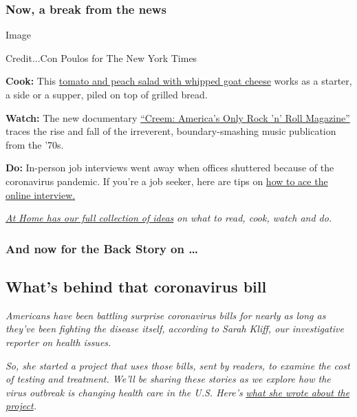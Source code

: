 \hypertarget{now-a-break-from-the-news}{%
\subsubsection{Now, a break from the
news}\label{now-a-break-from-the-news}}

Image

Credit...Con Poulos for The New York Times

\textbf{Cook:} This
\href{https://cooking.nytimes3xbfgragh.onion/recipes/1020367-tomato-and-peach-salad-with-whipped-goat-cheese}{tomato
and peach salad with whipped goat cheese} works as a starter, a side or
a supper, piled on top of grilled bread.

\textbf{Watch:} The new documentary
\href{https://www.nytimes3xbfgragh.onion/2020/08/03/arts/music/creem-magazine-documentary.html?action=click\&module=RelatedLinks\&pgtype=collection}{``Creem:
America's Only Rock 'n' Roll Magazine''} traces the rise and fall of the
irreverent, boundary-smashing music publication from the '70s.

\textbf{Do:} In-person job interviews went away when offices shuttered
because of the coronavirus pandemic. If you're a job seeker, here are
tips on
\href{https://www.nytimes3xbfgragh.onion/2020/08/03/business/online-job-interview-tips.html}{how
to ace the online interview.}

\href{https://www.nytimes3xbfgragh.onion/spotlight/at-home}{\emph{At
Home has our full collection of ideas}} \emph{on what to read, cook,
watch and do.}

\hypertarget{and-now-for-the-back-story-on-}{%
\subsubsection{And now for the Back Story on
\ldots{}}\label{and-now-for-the-back-story-on-}}

\hypertarget{whats-behind-that-coronavirus-bill}{%
\subsection{What's behind that coronavirus
bill}\label{whats-behind-that-coronavirus-bill}}

\emph{Americans have been battling surprise coronavirus bills for nearly
as long as they've been fighting the disease itself, according to Sarah
Kliff, our investigative reporter on health issues.}

\emph{So, she started a project that uses those bills, sent by readers,
to examine the cost of testing and treatment. We'll be sharing these
stories as we explore how the virus outbreak is changing health care in
the U.S. Here's}
\href{https://www.nytimes3xbfgragh.onion/2020/08/03/reader-center/coronavirus-medical-bills.html}{\emph{what
she wrote about the project}}\emph{.}

